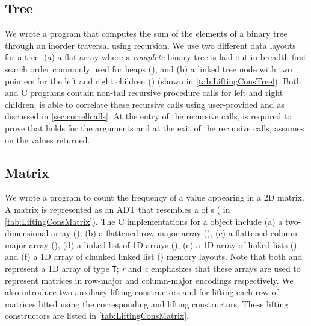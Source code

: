 \subsection{Tree}
\label{sec:exptree}
We wrote a \SpecL{} program that computes the sum of the elements of a binary tree
through an inorder traversal using recursion. We use two different data layouts for a tree: 
(a) a flat array where a
{\em complete} binary tree is laid out in breadth-first search order commonly used for heaps (),
and (b) a linked tree node with two pointers for the left and right children () (shown in \cref{tab:LiftingConsTree}).
Both \SpecL{} and C programs contain non-tail recursive procedure calls for left and right children.
\toolName{} is able to correlate these recursive calls using user-provided \pre{} and \post{} as discussed in \cref{sec:correlfcalls}.
At the entry of the recursive calls, \toolName{} is required to prove that \pre{} holds for the arguments
and at the exit of the recursive calls, \toolName{} assumes \post{} on the values returned.

\subsection{Matrix}
\label{sec:expmat}
\vspace{-5px}
We wrote a \SpecL{} program to count the frequency of a value appearing in a 2D matrix.
A matrix is represented as an ADT that resembles a  of s ( in \cref{tab:LiftingConsMatrix}).
The C implementations for a  object include
(a) a two-dimensional array (), (b) a flattened row-major array (),
(c) a flattened column-major array (), (d) a linked list of 1D arrays (),
(e) a 1D array of linked lists () and (f) a 1D array of chunked linked list ()
memory layouts. Note that both  and  represent a 1D array of type {\tt T}; {\em r} and {\em c}
emphasizes that these arrays are used to represent matrices in row-major and column-major encodings respectively.
We also introduce two auxiliary lifting constructors  and 
for lifting each row of matrices lifted using the corresponding  and   lifting
constructors. These lifting constructors are listed in \cref{tab:LiftingConsMatrix}.

